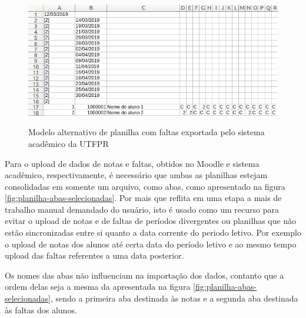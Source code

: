 \begin{figure}[!htb]
    \centering
    \caption{Modelo alternativo de planilha com faltas exportada pelo sistema acadêmico da UTFPR}
    \includegraphics[height=0.35\textwidth]{./dados/figuras/planilha-faltas-2}
    \label{fig:planilha-faltas-2}
\end{figure}

Para o upload de dados de notas e faltas, obtidos no Moodle e sistema acadêmico, respectivamente, é necessário que ambas as planilhas estejam consolidadas em somente um arquivo, como abas, como apresentado na figura \ref{fig:planilha-abas-selecionadas}.
Por mais que reflita em uma etapa a mais de trabalho manual demandado do usuário, isto é usado como um recurso para evitar o upload de notas e de faltas de períodos divergentes ou planilhas que não estão sincronizadas entre si quanto a data corrente do periodo letivo. 
Por exemplo o upload de notas dos alunos até certa data do período letivo e ao mesmo tempo upload das faltas referentes a uma data posterior.

Os nomes das abas não influenciam na importação dos dados, contanto que a ordem delas seja a mesma da apresentada na figura \ref{fig:planilha-abas-selecionadas}, sendo a primeira aba destinada às notas e a segunda aba destinada às faltas dos alunos.

